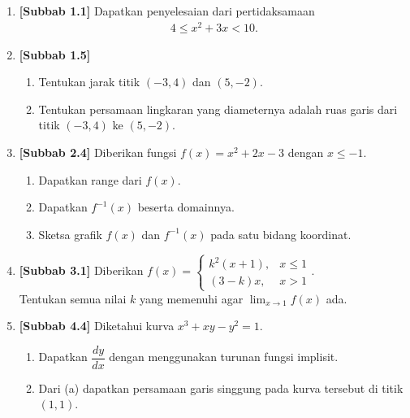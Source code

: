 \documentclass[10pt,openany,a4paper]{article}
\theoremstyle{definition}
\theoremstyle{definition}
\theoremstyle{plain}
\begin{document}
\begin{enumerate}
    \item \textbf{[Subbab 1.1]} Dapatkan penyelesaian dari pertidaksamaan
    \begin{align*}
        4\leq x^2+3x<10.
    \end{align*}

    \item \textbf{[Subbab 1.5]} \begin{enumerate}
        \item Tentukan jarak titik $(-3,4)$ dan $(5,-2)$.
        \item Tentukan persamaan lingkaran yang diameternya adalah ruas garis dari titik $(-3,4)$ ke $(5,-2)$.
    \end{enumerate}

    \item \textbf{[Subbab 2.4]} Diberikan fungsi $f(x)=x^2+2x-3$ dengan $x\leq -1$.
    \begin{enumerate}
        \item Dapatkan range dari $f(x)$.
        \item Dapatkan $f^{-1}(x)$ beserta domainnya.
        \item Sketsa grafik $f(x)$ dan $f^{-1}(x)$ pada satu bidang koordinat.
    \end{enumerate}

    \item \textbf{[Subbab 3.1]} Diberikan $f(x)=\begin{cases}
        k^2(x+1), & x\leq 1\\
        (3-k)x, & x>1
    \end{cases}$.\\
    Tentukan semua nilai $k$ yang memenuhi agar $\displaystyle\lim_{x\to 1}f(x)$ ada.

    \item \textbf{[Subbab 4.4]} Diketahui kurva $x^3+xy-y^2=1$.
    \begin{enumerate}
        \item Dapatkan $\dfrac{dy}{dx}$ dengan menggunakan turunan fungsi implisit.
        \item Dari (a) dapatkan persamaan garis singgung pada kurva tersebut di titik $(1,1)$.
    \end{enumerate}
\end{enumerate}
\end{document}

